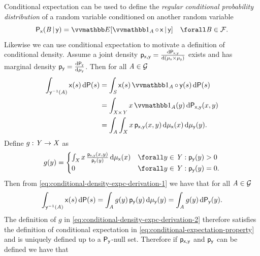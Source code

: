 Conditional expectation can be used to define the \emph{regular conditional probability distribution} of a random variable conditioned on another random variable
\begin{equation}\label{eq:regular-conditional-probability}
  \prob{\rvar{x}}(\set{B} \gvn \rvar{y}) = \expc{\ind{A}\circ\,\rvar{x} \gvn \rvar{y}}
  \quad\forall \set{B} \in \sset{F}.
\end{equation}
Likewise we can use conditional expectation to motivate a definition of conditional density. Assume a joint density $\mathsf{p}_{\mathsf{x},\mathsf{y}} = \frac{\mathrm{d} \mathsf{P}_{\mathsf{x},\mathsf{y}}}{\mathrm{d} (\mu_{\mathsf{x}}\times\mu_{\mathsf{y}})}$ exists and has marginal density $\mathsf{p}_{\mathsf{y}} = \frac{\mathrm{d} \mathsf{P}_{\mathsf{y}}}{\mathrm{d} \mu_{\mathsf{y}}}$. Then for all $\mathit{A} \in \mathcal{G}$
\begin{align}
  \int_{\rvar{y}^{-1}(\set{A})} \rvar{x}(s) \, \dr\probability(s) 
    &= \int_{\set{S}} \rvar{x}(s) \ind{\set{A}} \circ \, \rvar{y}(s) \,\dr\probability(s)\\
    &= \int_{\set{X}\times\set{Y}} x \ind{\set{A}}(y) \,\dr\prob{\rvar{x},\rvar{y}}(x,y)\\
    &= \int_{\set{A}} \int_{\set{X}} 
      x \, \pden{\rvar{x},\rvar{y}}(x,y) 
    \,\dr\mu_{\rvar{x}}(x) \,\dr\mu_{\rvar{y}}(y). \label{eq:conditional-density-expc-derivation-1}
\end{align}
Define $g : \mathit{Y} \to \mathit{X}$ as
\begin{equation}\label{eq:conditional-density-expc-derivation-2}
  g(y) = 
  \begin{cases}
    \int_{\set{X}} x \, \frac{\pden{\rvar{x},\rvar{y}}(x,y)}{\pden{\rvar{y}}(y)} \,\dr\mu_{\rvar{x}}(x)
    & \forall y \in \set{Y} : \pden{\rvar{y}}(y) > 0\\
    0 & \forall y \in \set{Y} : \pden{\rvar{y}}(y) = 0.
  \end{cases}
\end{equation}
Then from \eqref{eq:conditional-density-expc-derivation-1} we have that for all $\mathit{A} \in \mathcal{G}$
\begin{equation}
  \int_{\mathsf{y}^{-1}(\mathit{A})} \mathsf{x}(s) \, \mathrm{d}\mathsf{P}(s)
  =
  \int_{\mathit{A}} g(y) \, \mathsf{p}_{\mathsf{y}}(y) \,\mathrm{d}\mu_{\mathsf{y}}(y)
  =
  \int_{\mathit{A}} g(y) \,\mathrm{d}\mathsf{P}_{\mathsf{y}}(y).
\end{equation}
The definition of $g$ in \eqref{eq:conditional-density-expc-derivation-2} therefore satisfies the definition of conditional expectation in \eqref{eq:conditional-expectation-property} and is uniquely defined up to a $\mathsf{P}_{\mathsf{y}}$-null set. Therefore if $\mathsf{p}_{\mathsf{x},\mathsf{y}}$ and $\mathsf{p}_{\mathsf{y}}$ can be defined we have that 
